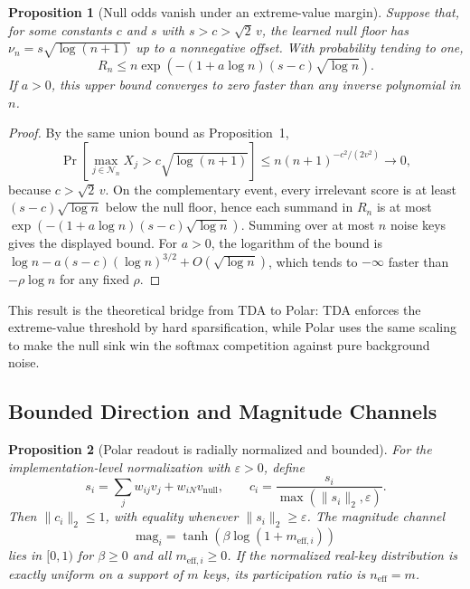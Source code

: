 \documentclass{article} %
\newtheorem{proposition}{Proposition}
\begin{document}
\begin{proposition}[Null odds vanish under an extreme-value margin]
Suppose that, for some constants $c$ and $s$ with $s>c>\sqrt{2}\,v$, the learned null floor
has $\nu_n=s\sqrt{\log(n+1)}$ up to a nonnegative offset. With probability tending to one,
\begin{equation}
    R_n \le
    n\exp\left(-(1+a\log n)(s-c)\sqrt{\log n}\right).
\end{equation}
If $a>0$, this upper bound converges to zero faster than any inverse polynomial in $n$.
\end{proposition}

\begin{proof}
By the same union bound as Proposition~1,
\begin{equation}
    \Pr\left[\max_{j\in\mathcal{N}_n} X_j > c\sqrt{\log(n+1)}\right]
    \le n(n+1)^{-c^2/(2v^2)} \to 0,
\end{equation}
because $c>\sqrt{2}\,v$. On the complementary event, every irrelevant score is at least
$(s-c)\sqrt{\log n}$ below the null floor, hence each summand in $R_n$ is at most
$\exp(-(1+a\log n)(s-c)\sqrt{\log n})$. Summing over at most $n$ noise keys gives the
displayed bound. For $a>0$, the logarithm of the bound is
$\log n-a(s-c)(\log n)^{3/2}+O(\sqrt{\log n})$, which tends to $-\infty$ faster than
$-\rho\log n$ for any fixed $\rho$.
\end{proof}

This result is the theoretical bridge from TDA to Polar: TDA enforces the extreme-value
threshold by hard sparsification, while Polar uses the same scaling to make the null sink
win the softmax competition against pure background noise.

\subsection{Bounded Direction and Magnitude Channels}

\begin{proposition}[Polar readout is radially normalized and bounded]
For the implementation-level normalization with $\varepsilon>0$, define
\begin{equation}
    s_i = \sum_j w_{ij}v_j + w_{iN}v_{\mathrm{null}},
    \qquad
    c_i = \frac{s_i}{\max(\lVert s_i\rVert_2,\varepsilon)}.
\end{equation}
Then $\lVert c_i\rVert_2\le1$, with equality whenever
$\lVert s_i\rVert_2\ge\varepsilon$. The magnitude channel
\begin{equation}
    \mathrm{mag}_i =
    \tanh\left(\beta\log(1+m_{\mathrm{eff},i})\right)
\end{equation}
lies in $[0,1)$ for $\beta\ge0$ and all $m_{\mathrm{eff},i}\ge0$. If the normalized
real-key distribution is exactly uniform on a support of $m$ keys, its participation ratio is
$n_{\mathrm{eff}}=m$.
\end{proposition}
\end{document}
